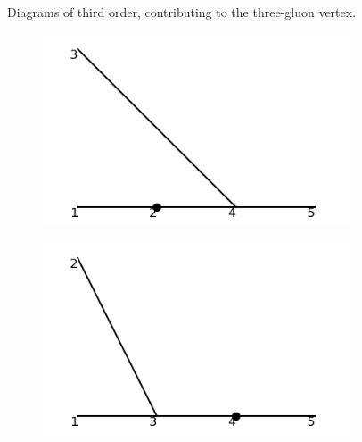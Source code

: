 \documentclass[11pt,a4paper,twoside,pdf]{article}
\numberwithin{equation}{section}
\begin{document}
\begin{figure}[h!]
\begin{subfigure}[t]{0.24\textwidth}
        \caption{ }
    \end{subfigure}
    \caption{Diagrams of third order, contributing to the three-gluon vertex.}
    \label{fig:order3_1to2}
\end{figure}

\begin{figure}[h!]
    \centering
    \begin{subfigure}[t]{0.24\textwidth}
        \centering
        \includegraphics[width=\textwidth]{plots/order3/order3_1to2/counterterms/2.png}
        \caption{ }
    \end{subfigure}
    \hfill
    \begin{subfigure}[t]{0.24\textwidth}
        \centering
        \includegraphics[width=\textwidth]{plots/order3/order3_1to2/counterterms/3.png}
        \caption{ }
    \end{subfigure}
    \hfill
    \begin{subfigure}[t]{0.24\textwidth}
        \centering

\end{subfigure}
\end{figure}
\end{document}
